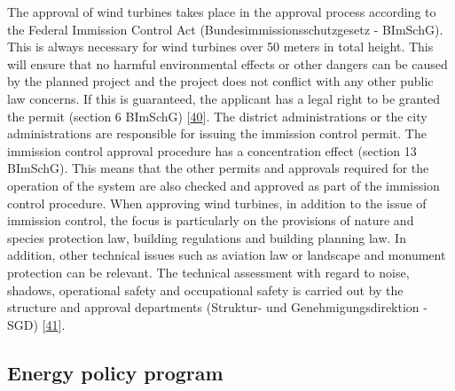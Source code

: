 \documentclass[a4paper,11pt]{article}
\begin{document}
The approval of wind turbines takes place in the approval process according to the Federal Immission Control Act (Bundesimmissionsschutzgesetz - BImSchG). This is always necessary for wind turbines over 50 meters in total height. This will ensure that no harmful environmental effects or other dangers can be caused by the planned project and the project does not conflict with any other public law concerns. If this is guaranteed, the applicant has a legal right to be granted the permit (section 6 BImSchG) {[}\protect\hyperlink{ref-BundesministeriumderJustizundfurVerbraucherschutz.2021}{40}{]}. The district administrations or the city administrations are responsible for issuing the immission control permit. The immission control approval procedure has a concentration effect (section 13 BImSchG). This means that the other permits and approvals required for the operation of the system are also checked and approved as part of the immission control procedure. When approving wind turbines, in addition to the issue of immission control, the focus is particularly on the provisions of nature and species protection law, building regulations and building planning law. In addition, other technical issues such as aviation law or landscape and monument protection can be relevant. The technical assessment with regard to noise, shadows, operational safety and occupational safety is carried out by the structure and approval departments (Struktur- und Genehmigungsdirektion - SGD) {[}\protect\hyperlink{ref-FachagenturWindenergieanLand.2021}{41}{]}.

\hypertarget{energy-policy-program}{%
\subsection{Energy policy program}\label{energy-policy-program}}
\end{document}
